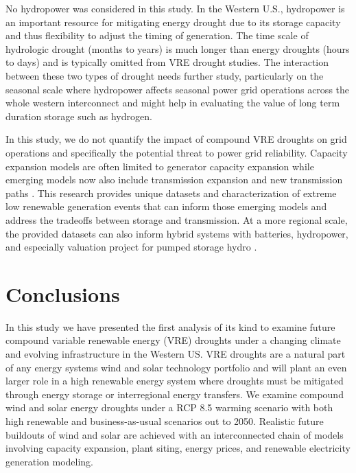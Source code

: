 \documentclass{agujournal2019}
\begin{document}
No hydropower was considered in this study. In the Western U.S., hydropower is an important resource for mitigating energy drought due to its storage capacity and thus flexibility to adjust the timing of generation. The time scale of hydrologic drought (months to years) is much longer than energy droughts (hours to days) and is typically omitted from VRE drought studies. The interaction between these two types of drought needs further study, particularly on the seasonal scale where hydropower affects seasonal power grid operations across the whole western interconnect \cite{Voisin_2018,Hill_2021} and might help in evaluating the value of long term duration storage such as hydrogen.

In this study, we do not quantify the impact of compound VRE droughts on grid operations and specifically the potential threat to power grid reliability. Capacity expansion models are often limited to generator capacity expansion while emerging models now also include transmission expansion and new transmission paths \cite{Gonzalez_Romero_2020}. This research provides unique datasets and characterization of extreme low renewable generation events that can inform those emerging models and address the tradeoffs between storage and transmission. At a more regional scale, the provided datasets can also inform hybrid systems with batteries, hydropower, and especially valuation project for pumped storage hydro \cite{Francois2016}. 

\section{Conclusions}

In this study we have presented the first analysis of its kind to examine future compound variable renewable energy (VRE) droughts under a changing climate and evolving infrastructure in the Western US. VRE droughts are a natural part of any energy systems wind and solar technology portfolio and will plant an even larger role in a high renewable energy system where droughts must be mitigated through energy storage or interregional energy transfers. We examine compound wind and solar energy droughts under a RCP 8.5 warming scenario with both high renewable and business-as-usual scenarios out to 2050. Realistic future buildouts of wind and solar are achieved with an interconnected chain of models involving capacity expansion, plant siting, energy prices, and renewable electricity generation modeling. 
\end{document}
